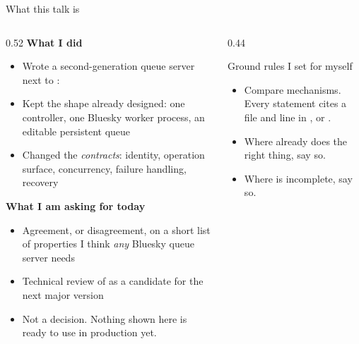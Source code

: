 
\begin{frame}{What this talk is}
    \begin{columns}[T]
        \begin{column}{0.52\textwidth}
            \footnotesize
            \textbf{What I did}
            \begin{itemize}
                \item Wrote a second-generation queue server next to \legacy{}:
                \item Kept the shape already designed: one controller, one Bluesky worker process,
                      an editable persistent queue
                \item Changed the \emph{contracts}: identity, operation surface, concurrency,
                      failure handling, recovery
            \end{itemize}
            \vspace{0.3cm}
            \textbf{What I am asking for today}
            \begin{itemize}
                \item Agreement, or disagreement, on a short list of properties
                      I think \emph{any} Bluesky queue server needs
                \item Technical review of \vtwo{} as a candidate for the next major version
                \item Not a decision. Nothing shown here is ready to use in production yet.
            \end{itemize}
        \end{column}
        \begin{column}{0.44\textwidth}
            \begin{block}{Ground rules I set for myself}
                \footnotesize
                \begin{itemize}
                    \item Compare mechanisms. Every \legacy{} statement
                          cites a file and line in ,  or
                          .
                    \item Where \legacy{} already does the right thing, say so.
                    \item Where \vtwo{} is incomplete, say so.

\end{itemize}
\end{block}
\end{column}
\end{columns}
\end{frame}
